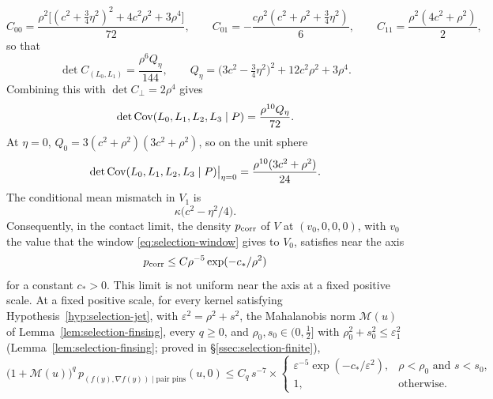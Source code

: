 \begin{lemma}
\begin{equation}
C_{00}=\frac{\rho^2\bigl[(c^2+\frac34\eta^2)^2+4c^2\rho^2+3\rho^4\bigr]}{72},\qquad C_{01}=-\frac{c\rho^2(c^2+\rho^2+\frac34\eta^2)}6,\qquad C_{11}=\frac{\rho^2(4c^2+\rho^2)}2,
\end{equation}
so that
\begin{equation}\label{eq:selection-det01}
\det C_{(L_0,L_1)}=\frac{\rho^6Q_\eta}{144},\qquad Q_\eta=\bigl(3c^2-\tfrac34\eta^2\bigr)^2+12c^2\rho^2+3\rho^4 .
\end{equation}
Combining this with $\det C_\perp=2\rho^4$ gives
\begin{equation}\label{eq:selection-det4}
\det\operatorname{Cov}(L_0,L_1,L_2,L_3\mid P)=\frac{\rho^{10}Q_\eta}{72}.
\end{equation}
At $\eta=0$, $Q_0=3(c^2+\rho^2)(3c^2+\rho^2)$, so on the unit sphere
\begin{equation}\label{eq:selection-det4sphere}
\det\operatorname{Cov}(L_0,L_1,L_2,L_3\mid P)\big|_{\eta=0}=\frac{\rho^{10}(3c^2+\rho^2)}{24}.
\end{equation}
The conditional mean mismatch in $V_1$ is
\begin{equation}\label{eq:selection-mismatch}
\kappa\bigl(c^2-\eta^2/4\bigr).
\end{equation}
Consequently, in the contact limit, the density $p_{\rm corr}$ of $V$ at $(v_0,0,0,0)$, with $v_0$ the value that the window \eqref{eq:selection-window} gives to $V_0$, satisfies near the axis
\begin{equation}\label{eq:selection-pcorr}
p_{\rm corr}\le C\rho^{-5}\exp(-c_*/\rho^2)
\end{equation}
for a constant $c_*>0$. This limit is not uniform near the axis at a fixed positive scale. At a fixed positive scale, for every kernel satisfying Hypothesis~\ref{hyp:selection-jet}, with $\varepsilon^2=\rho^2+s^2$, the Mahalanobis norm $\mathcal M(u)$ of Lemma~\ref{lem:selection-finsing}, every $q\ge0$, and $\rho_0,s_0\in(0,\frac12]$ with $\rho_0^2+s_0^2\le\varepsilon_1^2$ (Lemma~\ref{lem:selection-finsing}; proved in \S\ref{ssec:selection-finite}),
\begin{equation}\label{eq:selection-singdens}
\bigl(1+\mathcal M(u)\bigr)^q\,p_{(f(y),\nabla f(y))\mid\text{pair pins}}(u,0)\le C_q\,s^{-7}\times\begin{cases}\varepsilon^{-5}\exp(-c_*/\varepsilon^2),&\rho<\rho_0\text{ and }s<s_0,\\ 1,&\text{otherwise}.\end{cases}
\end{equation}
\end{lemma}

